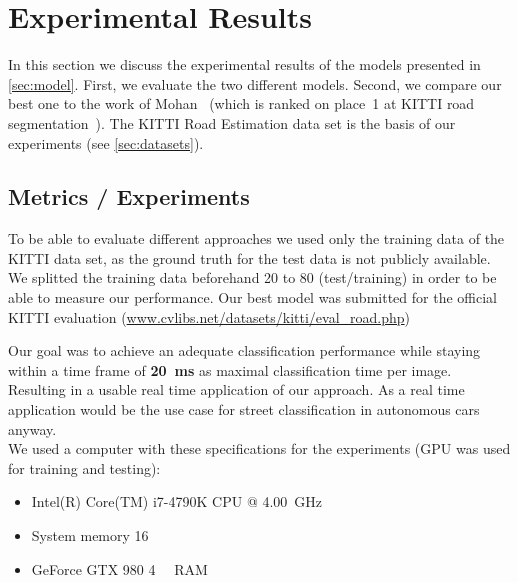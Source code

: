 
\section{Experimental Results}\label{sec:evaluation}

In this section we discuss the experimental results of the models
presented in \cref{sec:model}. First, we evaluate the two different
models. Second, we compare our best one to the work of
Mohan~\cite{Tarel2009} (which is ranked on place~1 at KITTI road
segmentation~\cite{Tarel2009}). The KITTI Road Estimation data set is the basis
of our experiments (see \cref{sec:datasets}).



\subsection{Metrics / Experiments}
To be able to evaluate different approaches we used only the
training data of the KITTI data set, as the ground truth for the test data is
not publicly available. We splitted the training data beforehand 20 to 80
(test/training) in order to be able to measure our performance. Our best model
was submitted for the official KITTI evaluation
(\href{http://www.cvlibs.net/datasets/kitti/eval_road.php}{www.cvlibs.net/datasets/kitti/eval\_road.php})


Our goal was to achieve an adequate classification performance while staying
within a time frame of \textbf{\SI{20}{\milli\second}} as maximal
classification time per image. Resulting in a usable real time application of
our approach. As a real time application would be the use case for street
classification in autonomous cars anyway.\\

We used a computer with these specifications for the experiments (GPU was used
for training and testing):
\begin{itemize}
    \item Intel(R) Core(TM) i7-4790K CPU @ \SI{4.00}{\giga\hertz}
    \item System memory \SI{16}{\gibi\byte}
    \item GeForce GTX 980 \SI{4}{\gibi\byte} RAM
\end{itemize}

